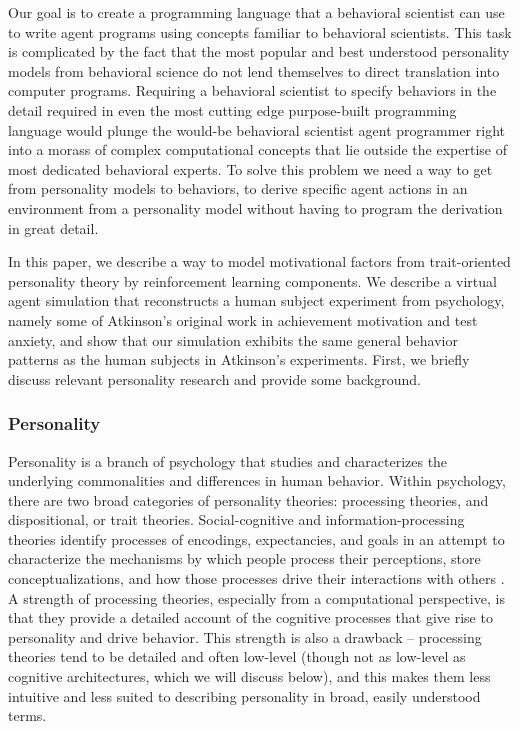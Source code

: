 Our goal is to create a programming language that a behavioral scientist can use to write agent programs using concepts familiar to behavioral scientists.  This task is complicated by the fact that the most popular and best understood personality models from behavioral science do not lend themselves to direct translation into computer programs.  Requiring a behavioral scientist to specify behaviors in the detail required in even the most cutting edge purpose-built programming language would plunge the would-be behavioral scientist agent programmer right into a morass of complex computational concepts that lie outside the expertise of most dedicated behavioral experts. To solve this problem we need a way to get from personality models to behaviors, to derive specific agent actions in an environment from a personality model without having to program the derivation in great detail.

In this paper, we describe a way to model motivational factors from trait-oriented personality theory by reinforcement learning components.  We describe a virtual agent simulation that reconstructs a human subject experiment from psychology, namely some of Atkinson's original work in achievement motivation and test anxiety, and show that our simulation exhibits the same general behavior patterns as the human subjects in Atkinson's experiments.  First, we briefly discuss relevant personality research and provide some background.

\subsubsection{Personality}

Personality is a branch of psychology that studies and characterizes the underlying commonalities and differences in human behavior. Within psychology, there are two broad categories of personality theories: processing theories, and dispositional, or trait theories. Social-cognitive and information-processing theories identify processes of encodings, expectancies, and goals in an attempt to characterize the mechanisms by which people process their perceptions, store conceptualizations, and how those processes drive their interactions with others \cite{dweck1988a-social-cognitive,cervone2009personality,cervone1999the-coherence}. A strength of processing theories, especially from a computational perspective, is that they provide a detailed account of the cognitive processes that give rise to personality and drive behavior.  This strength is also a drawback -- processing theories tend to be detailed and often low-level (though not as low-level as cognitive architectures, which we will discuss below), and this makes them less intuitive and less suited to describing personality in broad, easily understood terms.

